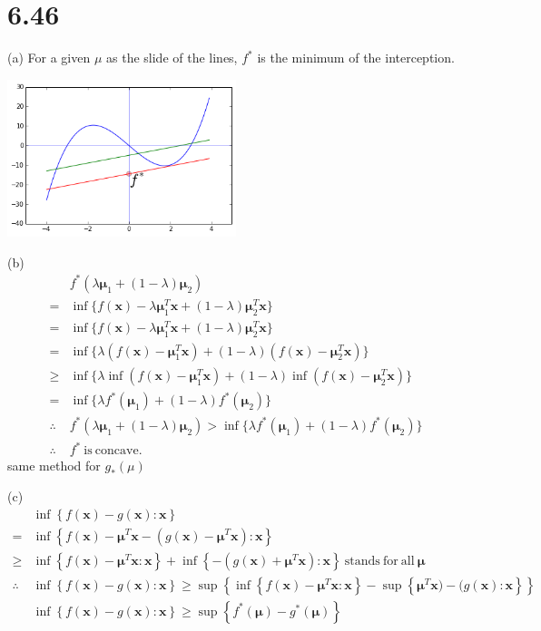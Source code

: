 \documentclass[12pt]{article}
\begin{document}
\section*{6.46}
(a)
For a given $\mu$ as the slide of the lines, $f^*$ is the minimum of the 
interception.
\begin{center}
\mbox{\includegraphics[width=0.5\textwidth]{./conj.png}}
\end{center}
(b)
\begin{align*}
&f^*(\lambda\bm \mu_1+(1- \lambda )\bm \mu_2)
\\
=&\inf\{f(\bm x)-\lambda\bm \mu_1^T\bm x+(1- \lambda )\bm \mu_2^T\bm x\}
\\
=&\inf\{f(\bm x)-\lambda\bm \mu_1^T\bm x+(1- \lambda )\bm \mu_2^T\bm x\}
\\
=&
\inf\{\lambda(f(\bm x)-\bm \mu_1^T\bm x)+(1- \lambda )(f(\bm x)-\bm \mu_2^T\bm x)\}
\\
\ge&
\inf\{\lambda\inf(f(\bm x)-\bm \mu_1^T\bm x)+(1- \lambda )\inf(f(\bm x)-\bm \mu_2^T\bm x)\}
\\
=&\inf\{\lambda f^*(\bm\mu_1) +(1- \lambda ) f^*(\bm\mu_2)\}
\\
\therefore&f^*(\lambda\bm \mu_1+(1- \lambda )\bm \mu_2)
>\inf\{\lambda f^*(\bm\mu_1) +(1- \lambda ) f^*(\bm\mu_2)\}
\\
\therefore&f^*\mathrm{\ is\ concave.}
\end{align*}
same method for $g_*(\mu)$

(c)
\begin{align*}
&\inf\left\{  f(\bm x) -g(\bm x):\bm x \right\}
\\
=&
\inf\left\{  f(\bm x)-\bm \mu^T\bm x -( g(\bm x)-\bm \mu^T\bm x ):\bm x \right\}
\\
\ge&
\inf\left\{  f(\bm x)-\bm \mu^T\bm x :\bm x\right\}+
\inf\left\{-( g(\bm x)+\bm \mu^T\bm x ):\bm x \right\} 
\mathrm{\ stands\ for\ all\ }\bm\mu
\\
\therefore&
\inf\left\{  f(\bm x) -g(\bm x):\bm x \right\}
\ge\sup\left\{ \inf\left\{  f(\bm x)-\bm \mu^T\bm x :\bm x\right\}-
\sup\left\{\bm \mu^T\bm x )-( g(\bm x):\bm x \right\} 
\right\}
\\
&\inf\left\{  f(\bm x) -g(\bm x):\bm x \right\}
\ge\sup\left\{
 f^*(\bm \mu) -g^*(\bm \mu)  \right\}
\end{align*}
\end{document}
